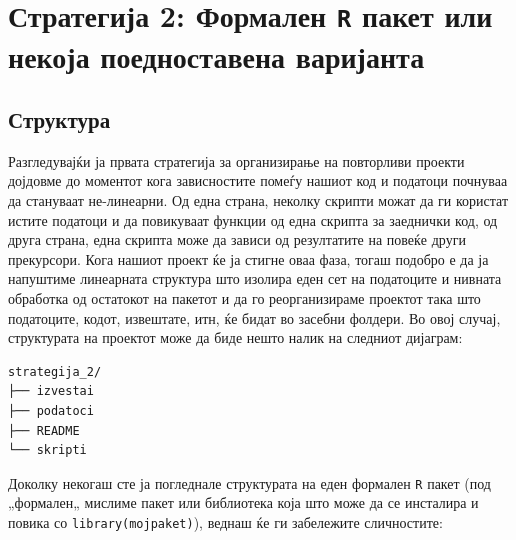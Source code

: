 \documentclass[
]{book}
\begin{document}
\hypertarget{ux441ux442ux440ux430ux442ux435ux433ux438ux458ux430-2-ux444ux43eux440ux43cux430ux43bux435ux43d-r-ux43fux430ux43aux435ux442-ux438ux43bux438-ux43dux435ux43aux43eux458ux430-ux43fux43eux435ux434ux43dux43eux441ux442ux430ux432ux435ux43dux430-ux432ux430ux440ux438ux458ux430ux43dux442ux430}{%
\section{\texorpdfstring{Стратегија 2: Формален \texttt{R} пакет или некоја поедноставена варијанта}{Стратегија 2: Формален R пакет или некоја поедноставена варијанта}}\label{ux441ux442ux440ux430ux442ux435ux433ux438ux458ux430-2-ux444ux43eux440ux43cux430ux43bux435ux43d-r-ux43fux430ux43aux435ux442-ux438ux43bux438-ux43dux435ux43aux43eux458ux430-ux43fux43eux435ux434ux43dux43eux441ux442ux430ux432ux435ux43dux430-ux432ux430ux440ux438ux458ux430ux43dux442ux430}}

\hypertarget{ux441ux442ux440ux443ux43aux442ux443ux440ux430-1}{%
\subsection{Структура}\label{ux441ux442ux440ux443ux43aux442ux443ux440ux430-1}}

Разгледувајќи ја првата стратегија за организирање на повторливи проекти дојдовме до моментот кога зависностите помеѓу нашиот код и податоци почнуваа да стануваат не-линеарни. Од една страна, неколку скрипти можат да ги користат истите податоци и да повикуваат функции од една скрипта за заеднички код, од друга страна, една скрипта може да зависи од резултатите на повеќе други прекурсори. Кога нашиот проект ќе ја стигне оваа фаза, тогаш подобро е да ја напуштиме линеарната структура што изолира еден сет на податоците и нивната обработка од остатокот на пакетот и да го реорганизираме проектот така што податоците, кодот, извештате, итн, ќе бидат во засебни фолдери. Во овој случај, структурата на проектот може да биде нешто налик на следниот дијаграм:

\begin{verbatim}
strategija_2/
├── izvestai
├── podatoci
├── README
└── skripti
\end{verbatim}

Доколку некогаш сте ја погледнале структурата на еден формален \texttt{R} пакет (под „формален„ мислиме пакет или библиотека која што може да се инсталира и повика со \texttt{library(mojpaket)}), веднаш ќе ги забележите сличностите:
\end{document}
